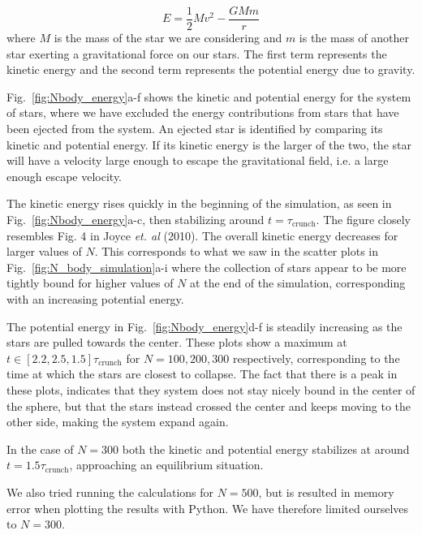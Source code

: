 \documentclass{article}
\begin{document}
\begin{multicols}{2}
\begin{equation}\label{eq:E_tot}
	E = \frac{1}{2}Mv^2 - \frac{GMm}{r}
\end{equation}
where $M$ is the mass of the star we are considering and $m$ is the mass of another star exerting a gravitational force on our stars. The first term represents the kinetic energy and the second term represents the potential energy due to gravity.

Fig.~\ref{fig:Nbody_energy}a-f shows the kinetic and potential energy for the system of stars, where we have excluded the energy contributions from stars that have been ejected from the system. An ejected star is identified by comparing its kinetic and potential energy. If its kinetic energy is the larger of the two, the star will have a velocity large enough to escape the gravitational field, i.e. a large enough escape velocity.

The kinetic energy rises quickly in the beginning of the simulation, as seen in Fig.~\ref{fig:Nbody_energy}a-c, then stabilizing around $t = \tau_{\mathrm{crunch}}$. The figure closely resembles Fig. 4 in Joyce \textit{et. al} (2010). The overall kinetic energy decreases for larger values of $N$. This corresponds to what we saw in the scatter plots in Fig.~\ref{fig:N_body_simulation}a-i where the collection of stars appear to be more tightly bound for higher values of $N$ at the end of the simulation, corresponding with an increasing potential energy.  

The potential energy in Fig.~\ref{fig:Nbody_energy}d-f is steadily increasing as the stars are pulled towards the center. These plots show a maximum at $t \in [2.2, 2.5, 1.5] \tau_{\mathrm{crunch}}$ for $N = 100,200,300$ respectively, corresponding to the time at which the stars are closest to collapse. The fact that there is a peak in these plots, indicates that they system does not stay nicely bound in the center of the sphere, but that the stars instead crossed the center and keeps moving to the other side, making the system expand again.

In the case of $N = 300$ both the kinetic and potential energy stabilizes at around $t = 1.5\tau_{\mathrm{crunch}}$, approaching an equilibrium situation. 

We also tried running the calculations for $N = 500$, but is resulted in memory error when plotting the results with Python. We have therefore limited ourselves to $N = 300$. 


\end{multicols}
\end{document}

